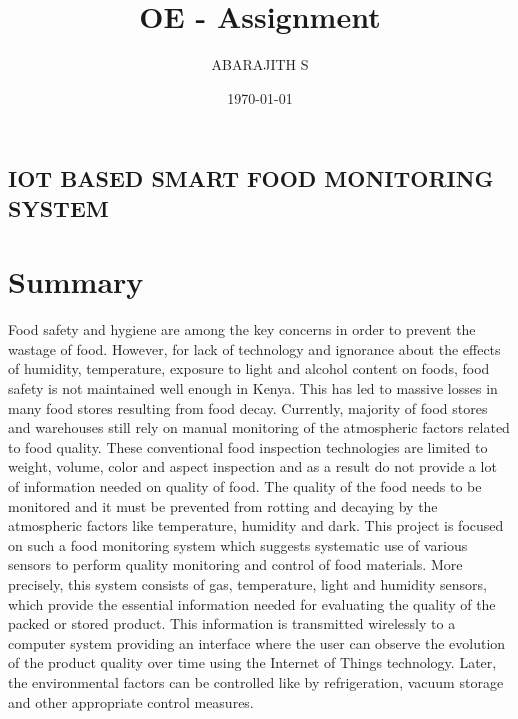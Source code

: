 \documentclass{report}
\title{OE - Assignment}
\author{ABARAJITH S}
\date{\today}
\begin{document}
    
    
    \begin{center}
        \section*{IOT BASED SMART FOOD MONITORING SYSTEM}
    \end{center}
\setlength{\columnsep}{1.0cm}
    \large
    \section*{Summary}
    Food safety and hygiene are among the key concerns in order to prevent the wastage of food. However, for lack of technology and ignorance about the effects of humidity, temperature, exposure to light and alcohol content on foods, food safety is not maintained well enough in Kenya. This has led to massive losses in many food stores resulting from food decay.
    Currently, majority of food stores and warehouses still rely on manual monitoring of the atmospheric factors related to food quality. These conventional food inspection technologies are limited to weight, volume, color and aspect inspection and as a result do not provide a lot of information needed on quality of food. The quality of the food needs to be monitored and it must be prevented from rotting and decaying by the atmospheric factors like temperature, humidity and dark.
    This project is focused on such a food monitoring system which suggests systematic use of various sensors to perform quality monitoring and control of food materials. More precisely, this system consists of gas, temperature, light and humidity sensors, which provide the essential information needed for evaluating the quality of the packed or stored product. This information is transmitted wirelessly to a computer system providing an interface where the user can observe the evolution of the product quality over time using the Internet of Things technology. Later, the environmental factors can be controlled like by refrigeration, vacuum storage and other appropriate control measures.
    
\end{document}

